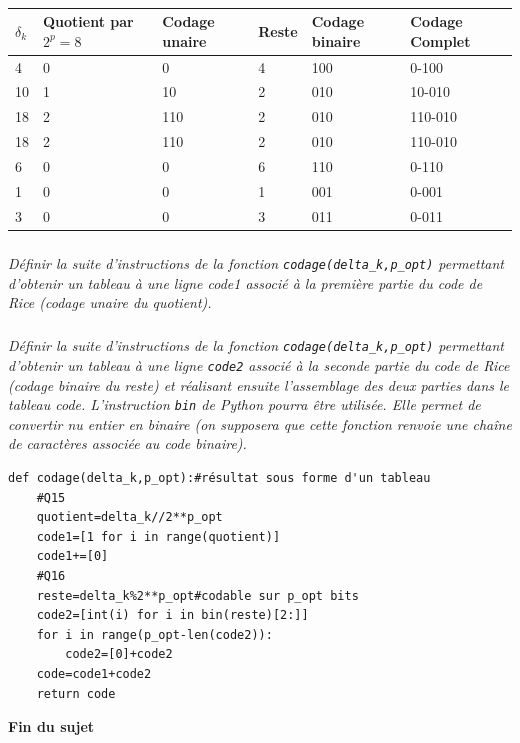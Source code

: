 \documentclass[10pt,fleqn]{article} %
\begin{document}
\fi

\ifprof
\begin{corrige} ~\\
\begin{center}
\begin{tabular}{|p{}|p{}|p{}|p{}|p{}|p{}|}
\hline
$\delta_k$& Quotient par $2^p=8$ & Codage unaire & Reste & Codage binaire & Codage Complet \\
\hline
4 & 0 & 0 & 4 & 100 & 0-100\\
\hline
10 & 1 & 10 & 2 & 010 & 10-010\\
\hline
18 & 2 & 110 & 2 & 010 & 110-010\\
\hline
18 & 2 & 110 & 2 & 010 & 110-010\\
\hline
6 & 0 & 0 & 6 & 110 & 0-110\\
\hline
1 & 0 & 0 & 1 & 001 & 0-001\\
\hline
3 & 0 & 0 & 3 & 011 & 0-011\\
\hline
\end{tabular}
\end{center}


\end{corrige}
\else
\fi

\subparagraph{}\textit{Définir la suite d’instructions de la fonction \texttt{codage(delta\_k,p\_opt)} permettant d’obtenir
un tableau à une ligne code1 associé à la première partie du code de Rice (codage unaire
du quotient).}
\ifprof
\begin{corrige}
\end{corrige}
\else
\fi

\subparagraph{}\textit{Définir la suite d’instructions de la fonction  \texttt{codage(delta\_k,p\_opt)} permettant d’obtenir
un tableau à une ligne \texttt{code2} associé à la seconde partie du code de Rice (codage binaire
du reste) et réalisant ensuite l’assemblage des deux parties dans le tableau code. L'instruction
\texttt{bin} de Python pourra être utilisée. Elle permet de convertir nu entier en binaire (on
supposera que cette fonction renvoie une chaîne de caractères associée au code binaire).}
\ifprof
\begin{corrige}

\begin{lstlisting}
def codage(delta_k,p_opt):#résultat sous forme d'un tableau
    #Q15    
    quotient=delta_k//2**p_opt
    code1=[1 for i in range(quotient)]
    code1+=[0]
    #Q16
    reste=delta_k%2**p_opt#codable sur p_opt bits
    code2=[int(i) for i in bin(reste)[2:]]
    for i in range(p_opt-len(code2)):
        code2=[0]+code2
    code=code1+code2
    return code
\end{lstlisting}
\end{corrige}
\else
\fi


\ifprof
\else
\vfill
\begin{center}
\textbf{	Fin du sujet	}
\end{center}
\vfill
\fi
\end{document}
